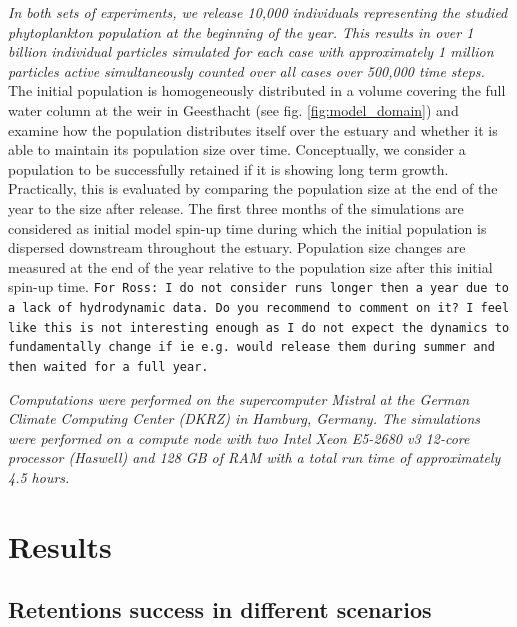\documentclass[npg, manuscript]{copernicus}
\begin{document}
\textit{
    In both sets of experiments, we release 10,000 individuals representing the studied phytoplankton population at the beginning of the year.
    This results in over 1 billion individual particles simulated for each case with approximately 1 million particles active simultaneously counted over all cases over 500,000 time steps.
}
The initial population is homogeneously distributed in a volume covering the full water column at the weir in Geesthacht (see fig. \ref{fig:model_domain}) and examine how the population distributes itself over the estuary and whether it is able to maintain its population size over time.
Conceptually, we consider a population to be successfully retained if it is showing long term growth. 
Practically, this is evaluated by comparing the population size at the end of the year to the size after release.
The first three months of the simulations are considered as initial model spin-up time during which the initial population is dispersed downstream throughout the estuary.
Population size changes are measured at the end of the year relative to the population size after this initial spin-up time.
\texttt{For Ross: I do not consider runs longer then a year due to a lack of hydrodynamic data. Do you recommend to comment on it? I feel like this is not interesting enough as I do not expect the dynamics to fundamentally change if ie e.g. would release them during summer and then waited for a full year.}

\textit{
    Computations were performed on the supercomputer Mistral at the German Climate Computing Center (DKRZ) in Hamburg, Germany.
    The simulations were performed on a compute node with two  Intel Xeon E5-2680 v3 12-core processor (Haswell) and 128 GB of RAM with a total run time of approximately 4.5 hours.
}

\section{Results}

\subsection{Retentions success in different scenarios}
\end{document}

